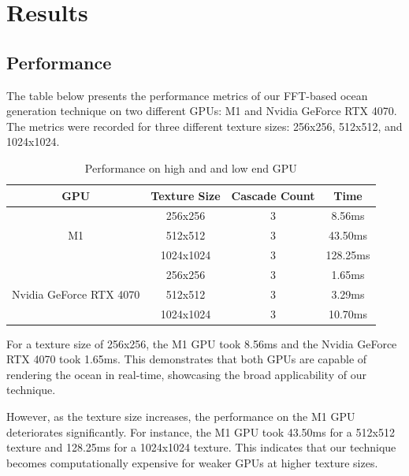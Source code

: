 \justifying
\chapter{Results}
\label{chapter3}

\section{Performance}

The table below presents the performance metrics of our FFT-based ocean generation technique on two different GPUs: M1 and Nvidia GeForce RTX 4070. The metrics were recorded for three different texture sizes: 256x256, 512x512, and 1024x1024.

\begin{table}[h]
    \centering
    \begin{tabular}{cccc}
        \toprule
        \textbf{GPU} & \textbf{Texture Size} & \textbf{Cascade Count} & \textbf{Time} \\
        \midrule
        \multirow{3}{*}{M1} & 256x256 & 3 & 8.56ms \\
                             & 512x512 & 3 & 43.50ms \\
                             & 1024x1024 & 3 & 128.25ms \\
        \midrule
        \multirow{3}{*}{Nvidia GeForce RTX 4070} & 256x256 & 3 & 1.65ms \\
                                                  & 512x512 & 3 & 3.29ms \\
                                                  & 1024x1024 & 3 & 10.70ms \\
        \bottomrule
    \end{tabular}
    \caption{Performance on high and and low end GPU}
    \label{tab:fft_performance}
\end{table}

For a texture size of 256x256, the M1 GPU took 8.56ms and the Nvidia GeForce RTX 4070 took 1.65ms. This demonstrates that both GPUs are capable of rendering the ocean in real-time, showcasing the broad applicability of our technique.

However, as the texture size increases, the performance on the M1 GPU deteriorates significantly. For instance, the M1 GPU took 43.50ms for a 512x512 texture and 128.25ms for a 1024x1024 texture. This indicates that our technique becomes computationally expensive for weaker GPUs at higher texture sizes.

